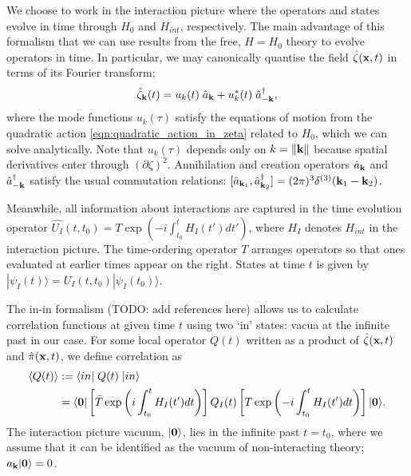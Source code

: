 We choose to work in the interaction picture where the operators and states evolve in time through $H_0$ and $H_{int}$, respectively. The main advantage of this formalism that we can use results from the free, $H=H_0$ theory to evolve operators in time. In particular, we may canonically quantise the field $\hat{\zeta}(\mathbf{x},t)$ in terms of its Fourier transform;
\begin{align}
	\hat{\zeta}_\mathbf{k} (t) = u_k(t) \; \hat{a}_\mathbf{k} + u_k^*(t) \; \hat{a}_{-\mathbf{k}}^\dagger, \label{eqn:zeta_canonical_quantisation}
\end{align} 
where the mode functions $u_k(\tau)$ satisfy the equations of motion from the quadratic action \eqref{eqn:quadratic_action_in_zeta} related to $H_0$, which we can solve analytically. Note that $u_k(\tau)$ depends only on $k=\|\mathbf{k}\|$ because spatial derivatives enter through $(\partial\zeta)^2$. Annihilation and creation operators $\hat{a}_\mathbf{k}$ and $\hat{a}_{-\mathbf{k}}^\dagger$ satisfy the usual commutation relations: $[\hat{a}_{\mathbf{k}_1},\hat{a}_{\mathbf{k}_2}^\dagger] = (2\pi)^3 \delta^{(3)}(\mathbf{k}_1-\mathbf{k}_2)$.

Meanwhile, all information about interactions are captured in the time evolution operator $\hat{U_I}(t,t_0) = T\exp \left(-i\int_{t_0}^t H_I(t')dt'\right)$, where $H_I$ denotes $H_{int}$ in the interaction picture. The time-ordering operator $T$ arranges operators so that ones evaluated at earlier times appear on the right. States at time $t$ is given by $|\psi_I(t)\rangle = U_I(t,t_0) |\psi_I(t_0)\rangle$.

The in-in formalism (TODO: add references here) allows us to calculate correlation functions at given time $t$ using two `in' states: vacua at the infinite past in our case. For some local operator $Q(t)$ written as a product of $\hat{\zeta}(\mathbf{x},t)$ and $\hat{\pi}(\mathbf{x},t)$, we define correlation as
\begin{align}
	\left< Q(t) \right> &:= \langle in |\;Q(t)\;| in \rangle \nonumber\\ &=  \langle\mathbf{0}| \left[ \bar{T} \exp \left( i \int_{t_0}^{t} H_I(t')dt \right) \right] Q_I(t) \left[ T \exp \left( -i \int_{t_0}^{t} H_I(t')dt \right) \right]  |\mathbf{0}\rangle. \label{eqn:in_in_formalism_expectation}
\end{align}
The interaction picture vacuum, $|\mathbf{0}\rangle$, lies in the infinite past $t=t_0$, where we assume that it can be identified as the vacuum of non-interacting theory; $a_\mathbf{k}|\mathbf{0}\rangle = 0$.

